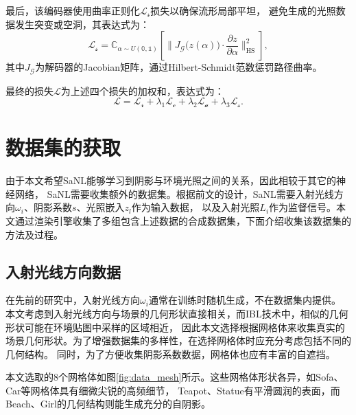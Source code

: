   最后，该编码器使用曲率正则化$\mathcal{L}_{\mathcal{s}}$损失以确保流形局部平坦，
  避免生成的光照数据发生突变或空洞，其表达式为：
  \begin{equation}
  \label{eq:curvature_loss}
  \mathcal{L}_{\mathcal{s}}=\mathbb{C}_{\alpha\sim U\left(\mathbb{0},\mathbb{1}\right)}\left[\|J_{\mathcal{G}}\bigl(z(\alpha)\bigr)\cdot\frac{\partial z}{\partial\alpha}\|_{\mathrm{HS}}^2\right],
  \end{equation}
  其中$J_{\mathcal{G}}$为解码器的Jacobian矩阵，通过Hilbert-Schmidt范数惩罚路径曲率。
  
  最终的损失$\mathcal{L}$为上述四个损失的加权和，表达式为：
  \begin{equation}
  \label{eq:total_loss}
  \mathcal{L}=\mathcal{L}_{\mathcal{r}}+\lambda_1\mathcal{L}_{\mathcal{c}}+\lambda_2\mathcal{L}_{\mathcal{a}}+\lambda_3\mathcal{L}_{\mathcal{s}}.
\end{equation}

\section{数据集的获取}

由于本文希望SaNL能够学习到阴影与环境光照之间的关系，因此相较于其它的神经网络，
SaNL需要收集额外的数据集。根据前文的设计，SaNL需要入射光线方向$\omega_i$、阴影系数$s$、光照嵌入$z_l$作为输入数据，
以及入射光照$L_i$作为监督信号。本文通过渲染引擎收集了多组包含上述数据的合成数据集，下面介绍收集该数据集的方法及过程。

\subsection{入射光线方向数据}

在先前的研究中，入射光线方向$\omega_i$通常在训练时随机生成，不在数据集内提供。
本文考虑到入射光线方向与场景的几何形状直接相关，而IBL技术中，相似的几何形状可能在环境贴图中采样的区域相近，
因此本文选择根据网格体来收集真实的场景几何形状。为了增强数据集的多样性，在选择网格体时应充分考虑包括不同的几何结构。
同时，为了方便收集阴影系数数据，网格体也应有丰富的自遮挡。

本文选取的8个网格体如图\ref{fig:data_mesh}所示。这些网格体形状各异，如Sofa、Car等网格体具有细微尖锐的高频细节，
Teapot、Statue有平滑圆润的表面，而Beach、Girl的几何结构则能生成充分的自阴影。

